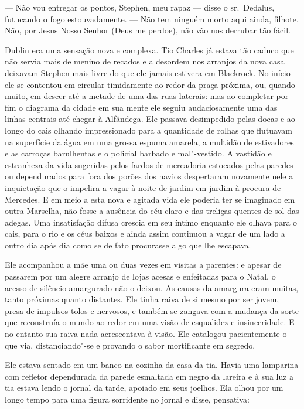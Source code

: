  --- Não vou entregar os pontos, Stephen, meu rapaz --- disse o sr.~Dedalus,
futucando o fogo estouvadamente. --- Não tem ninguém morto aqui ainda,
filhote. Não, por Jesus Nosso Senhor (Deus me perdoe), não vão nos
derrubar tão fácil.

Dublin era uma sensação nova e complexa. Tio Charles já estava tão
caduco que não servia mais de menino de recados e a desordem nos
arranjos da nova casa deixavam Stephen mais livre do que ele jamais
estivera em Blackrock. No início ele se contentou em circular
timidamente ao redor da praça próxima, ou, quando muito, em descer até a
metade de uma das ruas laterais: mas ao completar por fim o diagrama da
cidade em sua mente ele seguiu audaciosamente uma das linhas centrais
até chegar à Alfândega. Ele passava desimpedido pelas docas e ao longo
do cais olhando impressionado para a quantidade de rolhas que flutuavam
na superfície da água em uma grossa espuma amarela, a multidão de
estivadores e as carroças barulhentas e o policial barbado e mal"-vestido. A vastidão e estranheza da vida sugeridas pelos fardos de
mercadoria estocados pelas paredes ou dependurados para fora dos porões
dos navios despertaram novamente nele a inquietação que o impelira a
vagar à noite de jardim em jardim à procura de Mercedes. E em meio a
esta nova e agitada vida ele poderia ter se imaginado em outra
Marselha, não fosse a ausência do céu claro e das treliças quentes de
sol das adegas. Uma insatisfação difusa crescia em seu íntimo enquanto
ele olhava para o cais, para o rio e os céus baixos e ainda assim 
continuou a vagar de um lado a outro dia após dia como se de fato
procurasse algo que lhe escapava.

Ele acompanhou a mãe uma ou duas vezes em visitas a parentes: e apesar
de passarem por um alegre arranjo de lojas acesas e enfeitadas para o
Natal, o acesso de silêncio amargurado não o deixou. As causas da
amargura eram muitas, tanto próximas quanto distantes. Ele tinha raiva
de si mesmo por ser jovem, presa de impulsos tolos e nervosos, e também
se zangava com a mudança da sorte que reconstruía o mundo ao redor em
uma visão de esqualidez e insinceridade. E no entanto sua raiva nada
acrescentava à visão. Ele catalogou pacientemente o que via,
distanciando"-se e provando o sabor mortificante em segredo.

Ele estava sentado em um banco na cozinha da casa da tia. Havia uma
lamparina com refletor dependurada da parede esmaltada em negro da
lareira e à sua luz a tia estava lendo o jornal da tarde, apoiado em
seus joelhos. Ela olhou por um longo tempo para uma figura sorridente
no jornal e disse, pensativa:

